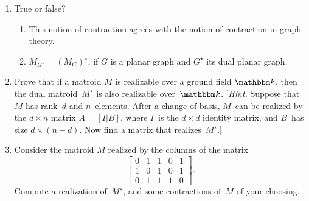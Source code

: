 \documentclass[11pt]{amsart}
\begin{document}
\bigskip
\begin{enumerate}
\item True or false?
  \begin{enumerate}
  \item This notion of contraction agrees with the notion of
    contraction in graph theory.
  \item $M_{G^\star} = (M_G)^\star$, if $G$ is a planar graph and $G^\star$ its dual planar graph.
  \end{enumerate}
  
  \bigskip
\item Prove that if a matroid $M$ is realizable over a ground field $\mathbbm k$, then the dual matroid~$M^\star$ is also realizable over~$\mathbbm k$.
  {\footnotesize\color{green!30!black} [\emph{Hint.} Suppose that $M$ has rank~$d$ and $n$~elements.
  After a change of basis, $M$~can be realized by the $d\times n$ matrix $A=[I|B]$, where $I$~is the $d\times d$ identity matrix, and $B$~has size $d\times(n-d)$.
  Now find a matrix that realizes~$M^\star$.]
}

\bigskip
\item
  Consider the matroid $M$ realized by the columns of the matrix
  \[
    \begin{bmatrix}
      0 & 1 & 1 & 0 & 1 \\
      1 & 0 & 1 & 0 & 1 \\
      0 & 1 & 1 & 1 & 0
    \end{bmatrix}.
  \]
  Compute a realization of~$M^\star$, and some contractions of~$M$ of your choosing.

\end{enumerate}
\end{document}
